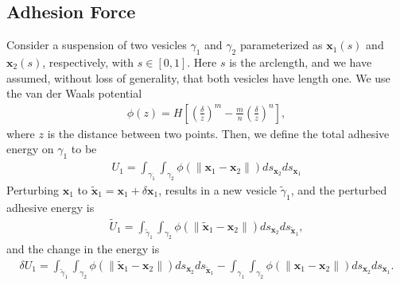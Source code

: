 \documentclass[prf,superscriptaddress,showpacs]{revtex4-1}
\newcommand{\xx}{\mathbf{x}}
\begin{document}
\begin{appendices}
\section{Adhesion Force}
\label{sec:appendixA}
Consider a suspension of two vesicles $\gamma_1$ and $\gamma_2$
parameterized as $\xx_1(s)$ and $\xx_2(s)$, respectively, with $s \in
[0,1]$.  Here $s$ is the arclength, and we have assumed, without loss of
generality, that both vesicles have length one.  We use the van der
Waals potential
\begin{align*}
  \phi(z) = H \left[ 
    \left(\frac{\delta}{z}\right)^m - \frac{m}{n}\left(\frac{\delta}{z}\right)^n \right],
\end{align*}
where $z$ is the distance between two points.  Then, we define the total
adhesive energy on $\gamma_1$ to be
\begin{align*}
  U_1 = \int_{\gamma_1} \int_{\gamma_2} \phi(\|\xx_1 - \xx_2\|) 
    ds_{\xx_2} ds_{\xx_1}
\end{align*}
Perturbing $\xx_1$ to $\tilde{\xx}_1 = \xx_1 +  \delta \xx_1$, results
in a new vesicle $\tilde{\gamma}_1$, and the perturbed adhesive energy is
\begin{align*}
  \widetilde{U}_1 = \int_{\tilde{\gamma}_1} \int_{\gamma_2}
  \phi(\|\tilde{\xx}_1 - \xx_2\|) ds_{\xx_2} ds_{\tilde{\xx}_1},
\end{align*}
and the change in the energy is
\begin{align*}
  \delta U_1 = \int_{\tilde{\gamma}_1} \int_{\gamma_2}
  \phi(\|\tilde{\xx}_1 - \xx_2\|) ds_{\xx_2} ds_{\tilde{\xx}_1} - 
  \int_{\gamma_1} \int_{\gamma_2} \phi(\|\xx_1 - \xx_2\|) 
  ds_{\xx_2} ds_{\xx_1}.
\end{align*}


\end{appendices}
\end{document}

